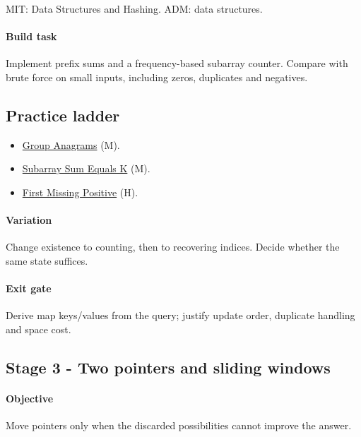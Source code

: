 \documentclass[11pt,letterpaper]{article}
\begin{document}
MIT: Data Structures and Hashing. ADM: data structures.

\paragraph*{Build task}

Implement prefix sums and a frequency-based subarray counter. Compare with brute force on small inputs, including zeros, duplicates and negatives.

\subsection*{Practice ladder}

\begin{itemize}

\item \href{https://leetcode.com/problems/group-anagrams/}{Group Anagrams} (M).

\item \href{https://leetcode.com/problems/subarray-sum-equals-k/}{Subarray Sum Equals K} (M).

\item \href{https://leetcode.com/problems/first-missing-positive/}{First Missing Positive} (H).

\end{itemize}

\paragraph*{Variation}

Change existence to counting, then to recovering indices. Decide whether the same state suffices.

\paragraph*{Exit gate}

Derive map keys/values from the query; justify update order, duplicate handling and space cost.

\par{}
\begin{samepage}
\section{Stage 3 - Two pointers and sliding windows}\label{sec:7}

\label{stage:3}


\paragraph*{Objective}

Move pointers only when the discarded possibilities cannot improve the answer.

\end{samepage}
\end{document}
